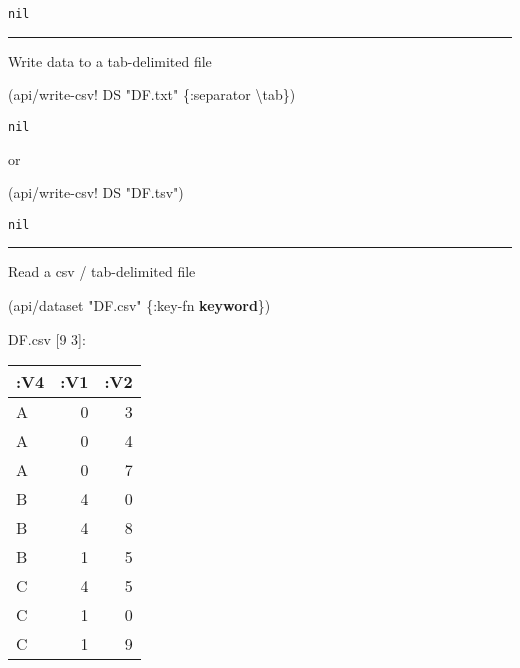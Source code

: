 \documentclass[]{article}
\newenvironment{Shaded}{\begin{snugshade}}{\end{snugshade}}
\newcommand{\KeywordTok}[1]{\textcolor[rgb]{0.13,0.29,0.53}{\textbf{#1}}}
\newcommand{\CharTok}[1]{\textcolor[rgb]{0.31,0.60,0.02}{#1}}
\newcommand{\StringTok}[1]{\textcolor[rgb]{0.31,0.60,0.02}{#1}}
\newcommand{\AttributeTok}[1]{\textcolor[rgb]{0.77,0.63,0.00}{#1}}
\newcommand{\NormalTok}[1]{#1}
\begin{document}
\begin{verbatim}
nil
\end{verbatim}

\begin{center}\rule{0.5\linewidth}{0.5pt}\end{center}

Write data to a tab-delimited file

\begin{Shaded}
\begin{Highlighting}[]
\NormalTok{(api/write-csv! DS }\StringTok{"DF.txt"}\NormalTok{ \{}\AttributeTok{:separator} \CharTok{\textbackslash{}tab}\NormalTok{\})}
\end{Highlighting}
\end{Shaded}

\begin{verbatim}
nil
\end{verbatim}

or

\begin{Shaded}
\begin{Highlighting}[]
\NormalTok{(api/write-csv! DS }\StringTok{"DF.tsv"}\NormalTok{)}
\end{Highlighting}
\end{Shaded}

\begin{verbatim}
nil
\end{verbatim}

\begin{center}\rule{0.5\linewidth}{0.5pt}\end{center}

Read a csv / tab-delimited file

\begin{Shaded}
\begin{Highlighting}[]
\NormalTok{(api/dataset }\StringTok{"DF.csv"}\NormalTok{ \{}\AttributeTok{:key-fn} \KeywordTok{keyword}\NormalTok{\})}
\end{Highlighting}
\end{Shaded}

DF.csv {[}9 3{]}:

\begin{longtable}[]{@{}lrr@{}}
\toprule
:V4 & :V1 & :V2\tabularnewline
\midrule
\endhead
A & 0 & 3\tabularnewline
A & 0 & 4\tabularnewline
A & 0 & 7\tabularnewline
B & 4 & 0\tabularnewline
B & 4 & 8\tabularnewline
B & 1 & 5\tabularnewline
C & 4 & 5\tabularnewline
C & 1 & 0\tabularnewline
C & 1 & 9\tabularnewline
\bottomrule
\end{longtable}
\end{document}
